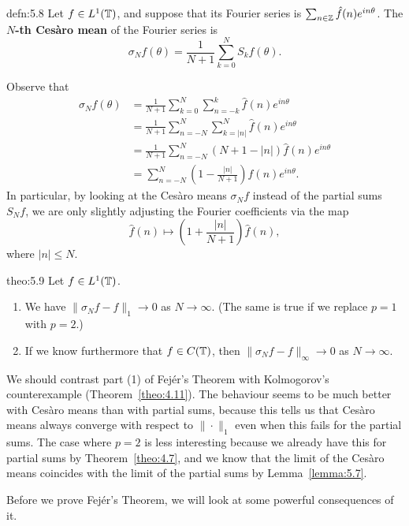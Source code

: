 \begin{defn}{defn:5.8}
    Let $f \in L^1(\mathbb{T})$, and suppose that its Fourier series is $\sum_{n\in\mathbb{Z}}
    \hat f(n) e^{in\theta}$. The {\bf $N$-th Ces\`aro mean} of the Fourier 
    series is 
    \[ \sigma_N f(\theta) = \frac{1}{N+1} \sum_{k=0}^N S_k f(\theta). \] 
\end{defn}

Observe that 
\begin{align*}
    \sigma_N f(\theta) 
    &= \frac{1}{N+1} \sum_{k=0}^N \sum_{n=-k}^k \hat f(n) e^{in\theta} \\ 
    &= \frac{1}{N+1} \sum_{n=-N}^N \sum_{k=|n|}^N \hat f(n) e^{in\theta} \\ 
    &= \frac{1}{N+1} \sum_{n=-N}^N (N + 1 - |n|) \hat f(n) e^{in\theta} \\ 
    &= \sum_{n=-N}^N \left( 1 - \frac{|n|}{N+1} \right) \hat f(n) e^{in\theta}. 
\end{align*}
In particular, by looking at the Ces\`aro means $\sigma_N f$ instead of 
the partial sums $S_N f$, we are only slightly adjusting the Fourier 
coefficients via the map 
\[ \hat f(n) \mapsto \left( 1 + \frac{|n|}{N+1} \right) \hat f(n), \] 
where $|n| \leq N$. 

\begin{theo}{theo:5.9}
    Let $f \in L^1(\mathbb{T})$. 
    \begin{enumerate}[(1)]
        \item We have $\|\sigma_N f - f\|_1 \to 0$ as $N \to \infty$. (The same 
        is true if we replace $p = 1$ with $p = 2$.)
        \item If we know furthermore that $f \in C(\mathbb{T})$, then $\|\sigma_N f - f\|_\infty
        \to 0$ as $N \to \infty$. 
    \end{enumerate}
\end{theo}

We should contrast part (1) of Fej\'er's Theorem with Kolmogorov's counterexample 
(Theorem~\ref{theo:4.11}). The behaviour seems to be much better with Ces\`aro means 
than with partial sums, because this tells us that Ces\`aro means always 
converge with respect to $\|\cdot\|_1$ even when this fails for the partial 
sums. The case where $p = 2$ is less interesting because we already have this 
for partial sums by Theorem~\ref{theo:4.7}, and we know that the limit of the 
Ces\`aro means coincides with the limit of the partial sums by Lemma~\ref{lemma:5.7}.

Before we prove Fej\'er's Theorem, we will look at some powerful consequences of it.

